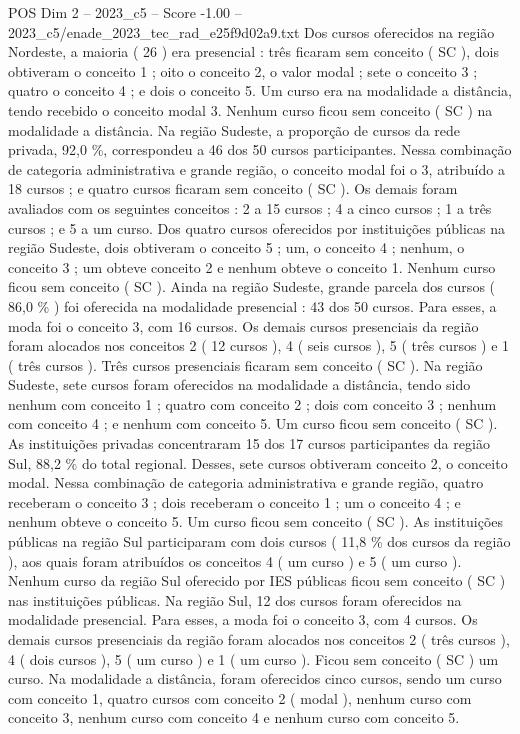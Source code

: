 \begin{textsample}{POS Dim 2 – 2023\_c5 – Score -1.00 – 2023\_c5/enade\_2023\_tec\_rad\_e25f9d02a9.txt}
Dos cursos oferecidos na região Nordeste, a maioria ( 26 ) era presencial : três ficaram sem conceito ( SC ), dois obtiveram o conceito 1 ; oito o conceito 2, o valor modal ; sete o conceito 3 ; quatro o conceito 4 ; e dois o conceito 5.
Um curso era na modalidade a distância, tendo recebido o conceito modal 3.
Nenhum curso ficou sem conceito ( SC ) na modalidade a distância.
Na região Sudeste, a proporção de cursos da rede privada, 92,0 \%, correspondeu a 46 dos 50 cursos participantes.
Nessa combinação de categoria administrativa e grande região, o conceito modal foi o 3, atribuído a 18 cursos ; e quatro cursos ficaram sem conceito ( SC ).
Os demais foram avaliados com os seguintes conceitos : 2 a 15 cursos ; 4 a cinco cursos ; 1 a três cursos ; e 5 a um curso.
Dos quatro cursos oferecidos por instituições públicas na região Sudeste, dois obtiveram o conceito 5 ; um, o conceito 4 ; nenhum, o conceito 3 ; um obteve conceito 2 e nenhum obteve o conceito 1.
Nenhum curso ficou sem conceito ( SC ).
Ainda na região Sudeste, grande parcela dos cursos ( 86,0 \% ) foi oferecida na modalidade presencial : 43 dos 50 cursos.
Para esses, a moda foi o conceito 3, com 16 cursos.
Os demais cursos presenciais da região foram alocados nos conceitos 2 ( 12 cursos ), 4 ( seis cursos ), 5 ( três cursos ) e 1 ( três cursos ).
Três cursos presenciais ficaram sem conceito ( SC ).
Na região Sudeste, sete cursos foram oferecidos na modalidade a distância, tendo sido nenhum com conceito 1 ; quatro com conceito 2 ; dois com conceito 3 ; nenhum com conceito 4 ; e nenhum com conceito 5.
Um curso ficou sem conceito ( SC ).
As instituições privadas concentraram 15 dos 17 cursos participantes da região Sul, 88,2 \% do total regional.
Desses, sete cursos obtiveram conceito 2, o conceito modal.
Nessa combinação de categoria administrativa e grande região, quatro receberam o conceito 3 ; dois receberam o conceito 1 ; um o conceito 4 ; e nenhum obteve o conceito 5.
Um curso ficou sem conceito ( SC ).
As instituições públicas na região Sul participaram com dois cursos ( 11,8 \% dos cursos da região ), aos quais foram atribuídos os conceitos 4 ( um curso ) e 5 ( um curso ).
Nenhum curso da região Sul oferecido por IES públicas ficou sem conceito ( SC ) nas instituições públicas.
Na região Sul, 12 dos cursos foram oferecidos na modalidade presencial.
Para esses, a moda foi o conceito 3, com 4 cursos.
Os demais cursos presenciais da região foram alocados nos conceitos 2 ( três cursos ), 4 ( dois cursos ), 5 ( um curso ) e 1 ( um curso ).
Ficou sem conceito ( SC ) um curso.
Na modalidade a distância, foram oferecidos cinco cursos, sendo um curso com conceito 1, quatro cursos com conceito 2 ( modal ), nenhum curso com conceito 3, nenhum curso com conceito 4 e nenhum curso com conceito 5.

\end{textsample}
